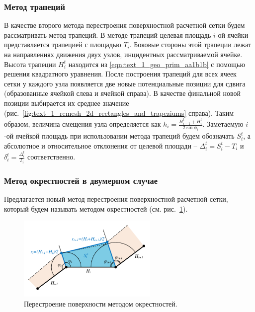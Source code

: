 \subsubsection{Метод трапеций}

В качестве второго метода перестроения поверхностной расчетной сетки будем рассматривать метод трапеций.
В методе трапеций целевая площадь $i$-ой ячейки представляется трапецией с площадью $T_i$.
Боковые стороны этой трапеции лежат на направлениях движения двух узлов, инцидентных рассматриваемой ячейке.
Высота трапеции $H_i^t$ находится из \eqref{eqn:text_1_geo_prim_aa1b1b} с помощью решения квадратного уравнения.
После построения трапеций для всех ячеек сетки у каждого узла появляется две новые потенциальные позиции для сдвига (образованные ячейкой слева и ячейкой справа).
В качестве финальной новой позиции выбирается их среднее значение (рис.~\ref{fig:text_1_remesh_2d_rectangles_and_trapeziums} справа).
Таким образом, величина смещения узла определяется как $h_i = \frac{H_{i - 1}^t + H_i^t}{2 \sin \phi_i}$.
Заметаемую $i$-ой ячейкой площадь при использовании метода трапеций будем обозначать $S_i^t$, а абсолютное и относительное отклонения от целевой площади -- $\Delta_i^t = S_i^t - T_i$ и $\delta_i^t = \frac{\Delta_i^t}{T_i}$ соответственно.

\subsubsection{Метод окрестностей в двумерном случае}

Предлагается новый метод перестроения поверхностной расчетной сетки, который будем называть методом окрестностей (см. рис.~\ref{fig:text_1_remesh_2d_okrestnost}).

\begin{figure}[ht]
\centering
\includegraphics[width=0.6\textwidth]{fig/2dr_remesh_okrestnost.pdf}
\singlespacing
{}\caption{Перестроение поверхности методом окрестностей.}
\label{fig:text_1_remesh_2d_okrestnost}
\end{figure}


